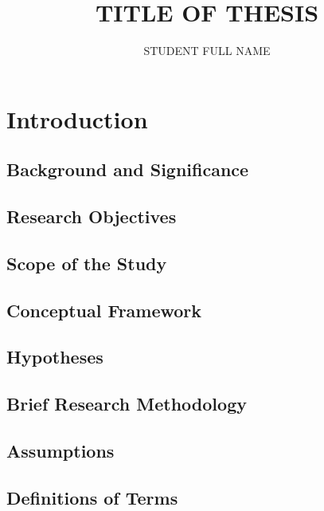 \documentclass{muthesis2026}
\title{TITLE OF THESIS}
\author{STUDENT FULL NAME}
\begin{document}
\maketitle



\tableofcontents
\listoftables
\listoffigures

\chapter{Introduction}
\section{Background and Significance}
\section{Research Objectives}
\section{Scope of the Study}
\section{Conceptual Framework}
\section{Hypotheses}
\section{Brief Research Methodology}
\section{Assumptions}
\section{Definitions of Terms}
\end{document}
